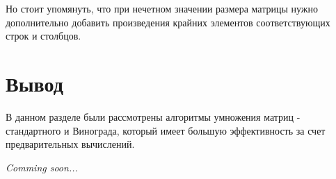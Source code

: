Но стоит упомянуть, что при нечетном значении размера матрицы нужно дополнительно добавить произведения крайних элементов соответствующих строк и столбцов.


\section*{Вывод}

В данном разделе были рассмотрены алгоритмы умножения матриц - стандартного и Винограда, который имеет большую эффективность за счет предварительных вычислений.

\textit{Comming soon...}


